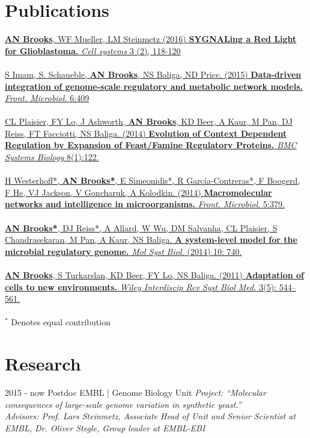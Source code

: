 \documentclass[]{friggeri-cv}
\begin{document}
\section{Publications}
\href{http://journal.frontiersin.org/article/10.3389/fmicb.2015.00409/abstract}{\noindent
\textbf{AN Brooks}, WF Mueller, LM Steinmetz (2016)
\textbf{SYGNALing a Red Light for Glioblastoma.}
\emph{Cell systems}  3 (2), 118-120
}
\\
\\
\href{http://journal.frontiersin.org/article/10.3389/fmicb.2015.00409/abstract}{\noindent
S Imam, S. Schaueble,  \textbf{AN Brooks}, NS Baliga, ND Price. (2015)
\textbf{Data-driven integration of genome-scale regulatory and metabolic network models.}
\emph{Front. Microbiol.} 6:409
}
\\
\\
\href{http://www.biomedcentral.com/1752-0509/8/122}{\noindent
CL Plaisier, FY Lo, J Ashworth, \textbf{AN Brooks}, KD Beer, A Kaur, M Pan, DJ Reiss, FT Facciotti, NS Baliga. (2014)
\textbf{Evolution of Context Dependent Regulation by Expansion of Feast/Famine Regulatory Proteins.}
\emph{BMC Systems Biology} 8(1):122.
}
\\
\\
\href{http://journal.frontiersin.org/article/10.3389/fmicb.2014.00379/abstract}{\noindent
H Westerhoff*, \textbf{AN Brooks*}, E Simeonidis*, R García-Contreras*, F Boogerd, F He, VJ Jackson, V Goncharuk, A Kolodkin. (2014)
\textbf{Macromolecular networks and intelligence in microorganisms.}
\emph{Front. Microbiol.} 5:379.
}
\\
\\
\href{http://msb.embopress.org/cgi/pmidlookup?view=long&pmid=25028489}{\noindent
\textbf{AN Brooks*}, DJ Reiss*, A Allard, W Wu, DM Salvanha, CL Plaisier, S Chandrasekaran, M Pan, A Kaur, NS Baliga.
\textbf{A system-level model for the microbial regulatory genome.}
\emph{Mol Syst Biol.} (2014) 10: 740.
}
\\
\\
\href{http://www.ncbi.nlm.nih.gov/pubmed/21197660}{\noindent
\textbf{AN Brooks}, S Turkarslan, KD Beer, FY Lo, NS Baliga. (2011)
\textbf{Adaptation of cells to new environments.}
\emph{Wiley Interdiscip Rev Syst Biol Med.} 3(5): 544–561.
}
\\
\\
$^{\ast}$ Denotes equal contribution

\section{Research}
\begin{entrylist}
  \entry
    {2015 - now}
    {Postdoc}
    {EMBL | Genome Biology Unit}
    {\emph{Project: ``Molecular consequences of large-scale genome variation in synthetic yeast.''}\\
    \emph{Advisors: Prof. Lars Steinmetz, Associate Head of Unit and Senior Scientist at EMBL, Dr. Oliver Stegle, Group leader at EMBL-EBI }\\}
\end{entrylist}
\end{document}
